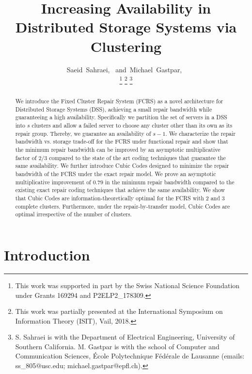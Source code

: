 \documentclass[journal,onecolumn,draftcls]{IEEEtran}
\begin{document}
\title{Increasing Availability in Distributed Storage Systems via Clustering}

\author{Saeid~Sahraei,~
         and~Michael~Gastpar,~
\date{}
\thanks{This work was supported in part by the Swiss National Science Foundation under Grants 169294 and P2ELP2\_178309.}
\thanks{This work was partially presented at the International Symposium on Information Theory (ISIT), Vail, 2018.}
\thanks{S. Sahraei is with the Department of Electrical Engineering, University of Southern California. M. Gastpar is with the school of Computer and Communication Sciences, {\'E}cole Polytechnique F{\'e}d{\'e}rale de Lausanne (emails: ss\_805@usc.edu; michael.gastpar@epfl.ch). }}

\maketitle 

\begin{abstract}
We introduce the Fixed Cluster Repair System (FCRS) as a novel architecture for Distributed Storage Systems (DSS), achieving a small repair bandwidth while guaranteeing a high availability. Specifically we partition the set of servers in a DSS into $s$ clusters and allow a failed server to choose any cluster other than its own as its repair group. Thereby, we guarantee an availability of $s-1$. We characterize the repair bandwidth vs. storage trade-off for the FCRS under functional repair and show that the minimum repair bandwidth can be improved by an asymptotic multiplicative factor of $2/3$ compared to the state of the art coding techniques that guarantee the same availability. We further introduce Cubic Codes designed to minimize the repair bandwidth of the FCRS under the exact repair model. We prove an asymptotic multiplicative improvement of $0.79$ in the minimum repair bandwidth compared to the existing exact repair coding techniques that achieve the same availability. We show that Cubic Codes are information-theoretically optimal for the FCRS with 2 and 3 complete clusters. Furthermore, under the repair-by-transfer model, Cubic Codes are optimal irrespective of the number of clusters.

\end{abstract}
\section{Introduction}
\end{document}
